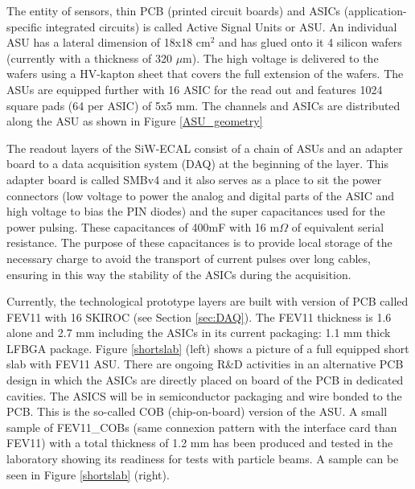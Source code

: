 \documentclass[a4paper,11pt]{article}
\begin{document}
The entity
of sensors, thin PCB (printed circuit boards) and ASICs (application-specific integrated circuits) is called Active Signal Units or ASU.
An individual ASU has a lateral dimension of 18x18 cm$^{2}$ and has glued onto it 4 silicon wafers (currently with a thickness of 320 $\mu$m). The high voltage is delivered to the wafers using a HV-kapton sheet that covers the full extension of the wafers.
The ASUs are equipped
further with 16 ASIC for the read out and features 1024 square pads (64 per ASIC) of 5x5 mm. The channels and ASICs are distributed along the ASU as shown in Figure \ref{ASU_geometry}

The readout layers of the SiW-ECAL consist of a chain of ASUs and an adapter board
to a data acquisition system (DAQ) at the beginning of the layer.
This adapter board is called SMBv4
and it also serves as a place to sit the power connectors (low voltage to power the analog and digital
parts of the ASIC and high voltage to bias the PIN diodes) and the super capacitances used for the power pulsing. 
These capacitances of 400mF with 16 m$\Omega$ of equivalent serial resistance. 
The purpose of these capacitances is to provide local storage 
of the necessary charge to avoid the transport of current pulses over long cables, 
ensuring in this way the stability of the ASICs during the acquisition. 

Currently, the technological prototype layers are built with version of PCB called FEV11 with 16 SKIROC (see Section \ref{sec:DAQ}).
The FEV11 thickness is 1.6 alone and 2.7 mm including the ASICs in its current packaging: 1.1 mm thick LFBGA package.
Figure \ref{shortslab} (left) shows a picture of a full equipped short slab with FEV11 ASU.
There are ongoing R\&D activities in an alternative PCB design in which the ASICs
are directly placed on board of the PCB in dedicated cavities.
The ASICS will be in semiconductor packaging and wire bonded to the PCB. This is the so-called COB (chip-on-board) version of the ASU.
A small sample of FEV11\_COBs (same connexion pattern with the interface card than FEV11)
with a total thickness of 1.2 mm has been produced and tested in the laboratory
showing its readiness for tests with particle beams. A sample can be seen in Figure \ref{shortslab} (right).
\end{document}

